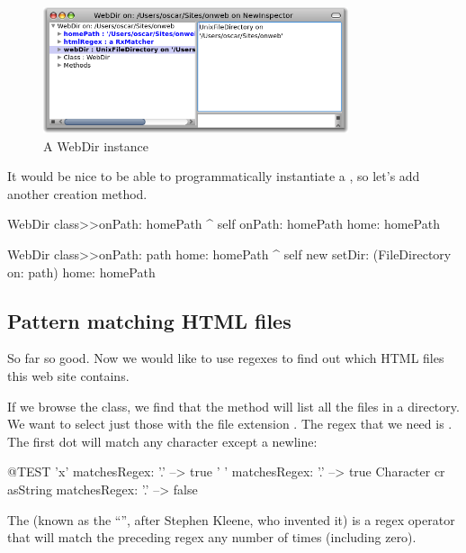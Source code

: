 \documentclass[a4paper,10pt,twoside]{book}
\begin{document}
\begin{figure}[tbh]
\begin{center}
\includegraphics[width=0.8\textwidth]{aWebDir}
\caption{A WebDir instance}
\end{center}
\end{figure}

It would be nice to be able to programmatically instantiate a , so let's add another creation method.


\begin{code}{}
WebDir class>>onPath: homePath
	^ self onPath: homePath home: homePath

WebDir class>>onPath: path home: homePath
	^ self new setDir: (FileDirectory on: path) home: homePath
\end{code}

\subsection{Pattern matching HTML files}

So far so good.
Now we would like to use regexes to find out which HTML files this web site contains.

If we browse the  class, we find that the method  will list all the files in a directory. We want to select just those with the file extension . The regex that we need is . The first dot will match any character except a newline:

\begin{code}{@TEST}
'x' matchesRegex: '.' --> true
' ' matchesRegex: '.'  --> true
Character cr asString matchesRegex: '.' --> false
\end{code}

The \ct{*} (known as the ``'', after Stephen Kleene, who invented it) is a regex operator that will match the preceding regex any number of times (including zero).
\end{document}
